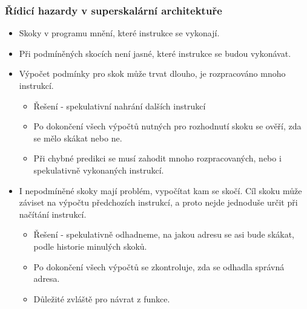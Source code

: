 \documentclass{beamer}
\begin{document}
\begin{frame}
\frametitle{Řídicí hazardy v superskalární architektuře}

\begin{itemize}
\item Skoky v programu mnění, které instrukce se vykonají.
\item Při podmíněných skocích není jasné, které instrukce se budou vykonávat.
\item Výpočet podmínky pro skok může trvat dlouho, je rozpracováno mnoho instrukcí.
\begin{itemize}
\item Řešení - spekulativní nahrání dalších instrukcí
\item Po dokončení všech výpočtů nutných pro rozhodnutí skoku se ověří, zda se mělo skákat nebo ne.
\item Při chybné predikci se musí zahodit mnoho rozpracovaných, nebo i spekulativně vykonaných instrukcí.
\end{itemize}
\item I nepodmíněné skoky mají problém, vypočítat kam se skočí. Cíl skoku může záviset na výpočtu předchozích instrukcí, a proto nejde jednoduše určit při načítání instrukcí.
\begin{itemize}
\item Řešení - spekulativně odhadneme, na jakou adresu se asi bude skákat, podle historie minulých skoků.
\item Po dokončení všech výpočtů se zkontroluje, zda se odhadla správná adresa.
\item Důležité zvláště pro návrat z funkce.
\end{itemize}
\end{itemize}

\end{frame}
\end{document}
